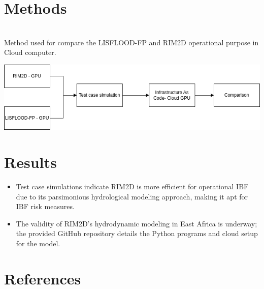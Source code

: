 \documentclass[a0paper,fleqn]{betterposter}
\begin{document}
{\begin{itemize}
		\end{itemize}
		
		\section{Methods}
		\\ Method used for compare the LISFLOOD-FP and RIM2D operational purpose in Cloud computer.
		\begin{center}
			\includegraphics[width=\textwidth]{img/rim2d.png}
		\end{center}
		
	    \section{Results}
		\begin{itemize}
			\item Test case simulations indicate RIM2D is more efficient for operational IBF due to its parsimonious hydrological modeling approach, making it apt for IBF risk measures.
			\item The validity of RIM2D's hydrodynamic modeling in East Africa is underway; the provided GitHub repository details the Python programs and cloud setup for the model.
	
		\end{itemize}
		\section{References}
		\renewcommand{\bibsection}{}                                                                                                               
		
}
\end{document}
